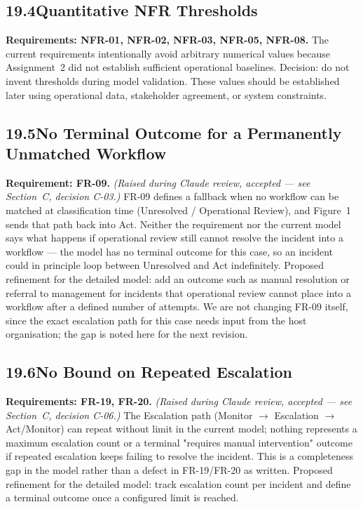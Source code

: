 \documentclass[11pt,a4paper]{article}
\begin{document}
\subsection*{19.4\enspace Quantitative NFR Thresholds}

\textbf{Requirements: NFR-01, NFR-02, NFR-03, NFR-05, NFR-08.} The current requirements intentionally avoid arbitrary numerical values because Assignment~2 did not establish sufficient operational baselines. Decision: do not invent thresholds during model validation. These values should be established later using operational data, stakeholder agreement, or system constraints.

\subsection*{19.5\enspace No Terminal Outcome for a Permanently Unmatched Workflow}

\textbf{Requirement: FR-09.} \textit{(Raised during Claude review, accepted — see Section~C, decision C-03.)} FR-09 defines a fallback when no workflow can be matched at classification time (Unresolved / Operational Review), and Figure~1 sends that path back into Act. Neither the requirement nor the current model says what happens if operational review still cannot resolve the incident into a workflow — the model has no terminal outcome for this case, so an incident could in principle loop between Unresolved and Act indefinitely. Proposed refinement for the detailed model: add an outcome such as manual resolution or referral to management for incidents that operational review cannot place into a workflow after a defined number of attempts. We are not changing FR-09 itself, since the exact escalation path for this case needs input from the host organisation; the gap is noted here for the next revision.

\subsection*{19.6\enspace No Bound on Repeated Escalation}

\textbf{Requirements: FR-19, FR-20.} \textit{(Raised during Claude review, accepted — see Section~C, decision C-06.)} The Escalation path (Monitor $\rightarrow$ Escalation $\rightarrow$ Act/Monitor) can repeat without limit in the current model; nothing represents a maximum escalation count or a terminal "requires manual intervention" outcome if repeated escalation keeps failing to resolve the incident. This is a completeness gap in the model rather than a defect in FR-19/FR-20 as written. Proposed refinement for the detailed model: track escalation count per incident and define a terminal outcome once a configured limit is reached.
\end{document}
